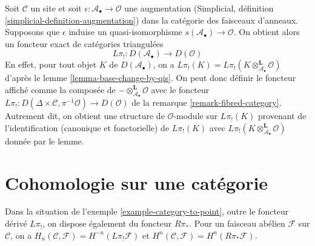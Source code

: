 \begin{remark}
\label{remark-homology-augmentation}
Soit $\mathcal{C}$ un site et soit
$\epsilon : \mathcal{A}_\bullet \to \mathcal{O}$ une augmentation
(Simplicial, définition \ref{simplicial-definition-augmentation}) dans la
catégorie des faisceaux d'anneaux. Supposons que $\epsilon$ induise un
quasi-isomorphisme $s(\mathcal{A}_\bullet) \to \mathcal{O}$. On obtient alors
un foncteur exact de catégories triangulées
$$
L\pi_! : D(\mathcal{A}_\bullet) \longrightarrow D(\mathcal{O})
$$
En effet, pour tout objet $K$ de $D(\mathcal{A}_\bullet)$, on a
$L\pi_!(K) = L\pi_!(K \otimes_{\mathcal{A}_\bullet}^\mathbf{L} \mathcal{O})$
d'après le lemme \ref{lemma-base-change-by-qis}. On peut donc définir le
foncteur affiché comme la composée de
$- \otimes^\mathbf{L}_{\mathcal{A}_\bullet} \mathcal{O}$ avec le foncteur
$L\pi_! : D(\Delta \times \mathcal{C}, \pi^{-1}\mathcal{O}) \to
D(\mathcal{O})$ de la remarque \ref{remark-fibred-category}. Autrement dit,
on obtient une structure de $\mathcal{O}$-module sur $L\pi_!(K)$ provenant de
l'identification (canonique et fonctorielle) de $L\pi_!(K)$ avec
$L\pi_!(K \otimes_{\mathcal{A}_\bullet}^\mathbf{L} \mathcal{O})$ donnée par
le lemme.
\end{remark}






\section{Cohomologie sur une catégorie}
\label{section-cohomology}

\noindent
Dans la situation de l'exemple \ref{example-category-to-point}, outre le
foncteur dérivé $L\pi_!$, on dispose également du foncteur $R\pi_*$. Pour un
faisceau abélien $\mathcal{F}$ sur $\mathcal{C}$, on a
$H_n(\mathcal{C}, \mathcal{F}) = H^{-n}(L\pi_!\mathcal{F})$ et
$H^n(\mathcal{C}, \mathcal{F}) = H^n(R\pi_*\mathcal{F})$.


